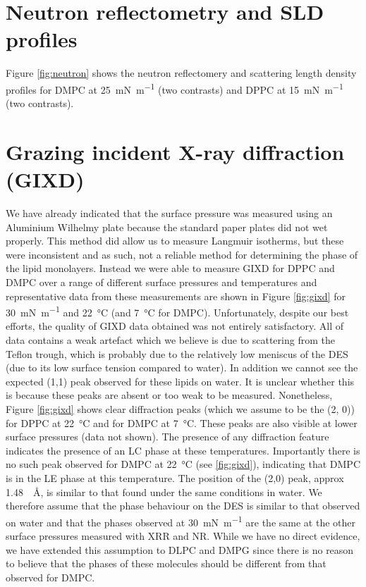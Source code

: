 \documentclass[amsmath,amssymb,superscriptaddress]{revtex4-1}
\begin{document}
\section{Neutron reflectometry and SLD profiles}
Figure \ref{fig:neutron} shows the neutron reflectomery and scattering length density profiles for DMPC at \SI{25}{\milli\newton\per\meter} (two contrasts) and DPPC at \SI{15}{\milli\newton\per\meter} (two contrasts).

\section{Grazing incident X-ray diffraction (GIXD)}
\label{sec:gixd}
We have already indicated that the surface pressure was measured using an Aluminium Wilhelmy plate because the standard paper plates did not wet properly. This method did allow us to measure Langmuir isotherms, but these were inconsistent and as such, not a reliable method for determining the phase of the lipid monolayers.
Instead we were able to measure GIXD for DPPC and DMPC over a range of different surface pressures and temperatures and representative data from these measurements are shown in Figure \ref{fig:gixd} for \SI{30}{\milli\newton\per\meter} and \SI{22}{\celsius} (and \SI{7}{\celsius} for DMPC).
Unfortunately, despite our best efforts, the quality of GIXD data obtained was not entirely satisfactory.
All of data contains a weak artefact which we believe is due to scattering from the Teflon trough, which is probably due to the relatively low meniscus of the DES (due to its low surface tension compared to water). In addition we cannot see the expected (1,1) peak observed for these lipids on water.
It is unclear whether this is because these peaks are absent or too weak to be measured.
Nonetheless, Figure \ref{fig:gixd} shows clear diffraction peaks (which we assume to be the (2, 0)) for DPPC at \SI{22}{\celsius} and for DMPC at \SI{7}{\celsius}.
These peaks are also visible at lower surface pressures (data not shown).
The presence of any diffraction feature indicates the presence of an LC phase at these temperatures.
Importantly there is no such peak observed for DMPC at \SI{22}{\celsius} (see \ref{fig:gixd}), indicating that DMPC is in the LE phase at this temperature.
The position of the (2,0) peak, approx \SI{1.48}{\per\angstrom}, is similar to that found under the same conditions in water.\cite{Watkins2009}
We therefore assume that the phase behaviour on the DES is similar to that observed on water and that the phases observed at \SI{30}{\milli\newton\per\meter} are the same at the other surface pressures measured with XRR and NR.
While we have no direct evidence, we have extended this assumption to DLPC and DMPG since there is no reason to believe that the phases of these molecules should be different from that observed for DMPC.
\end{document}
